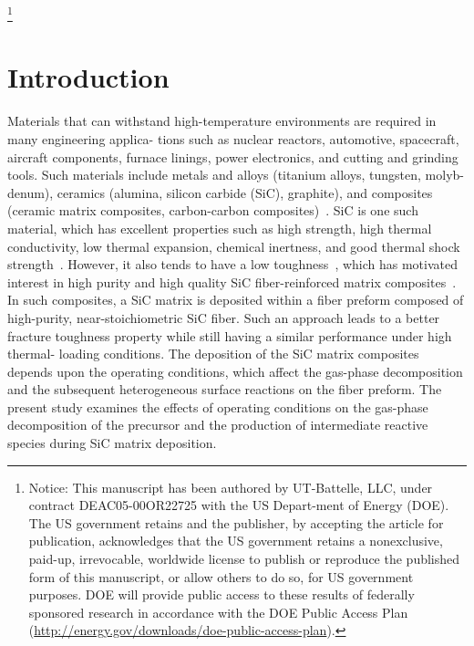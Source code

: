 \documentclass[final, letterpaper, square, comma, numbers, sort&compress]{elsarticle}
\begin{document}
\let\thefootnote\relax\footnote{Notice: This manuscript has been authored by UT-Battelle, LLC, under contract DEAC05-00OR22725 with the US Depart-ment of Energy (DOE). The US government retains and the publisher, by accepting the article for publication, acknowledges that the US government retains a nonexclusive, paid-up, irrevocable, worldwide license to publish or reproduce the published form of this manuscript, or allow others to do so, for US government purposes. DOE will provide public access to these results of federally sponsored research in accordance with the DOE Public Access Plan (\ttfamily \href{http://energy.gov/downloads/doe-public-access-plan}{http://energy.gov/downloads/doe-public-access-plan}).}

\section{Introduction}
\label{S:1}

Materials that can withstand high-temperature environments are required in many engineering applica- tions such as nuclear reactors, automotive, spacecraft, aircraft components, furnace linings, power electronics,
and cutting and grinding tools. Such materials include metals and alloys (titanium alloys, tungsten, molyb- denum), ceramics (alumina, silicon carbide (SiC), graphite), and composites (ceramic matrix composites, carbon-carbon composites)~\cite{Meetham1991,Tressler1999,Belmonte2006,Fahrenholtz2014,BarCohen2014}. SiC is one such material, which has excellent properties such as high strength, high thermal conductivity, low thermal expansion, chemical inertness, and good thermal shock strength~\cite{Levinshtein2001,Hironaka2002,Snead2007,Presser2008}. However, it also tends to have a low toughness~\cite{Padture1994,Mulla1994,Cao1995}, which has motivated interest in high purity and high quality SiC fiber-reinforced matrix composites~\cite{Naslain1995,Prewo1989,Besmann1991,Wang1996,Prouhet1994,Zhu1999,Liu2023}. In such composites, a SiC matrix is deposited within a fiber preform composed of high-purity, near-stoichiometric SiC fiber. Such an approach leads to a better fracture toughness property while still having a similar performance under high thermal- loading conditions. The deposition of the SiC matrix composites depends upon the operating conditions, which affect the gas-phase decomposition and the subsequent heterogeneous surface reactions on the fiber preform. The present study examines the effects of operating conditions on the gas-phase decomposition of the precursor and the production of intermediate reactive species during SiC matrix deposition.
\end{document}
